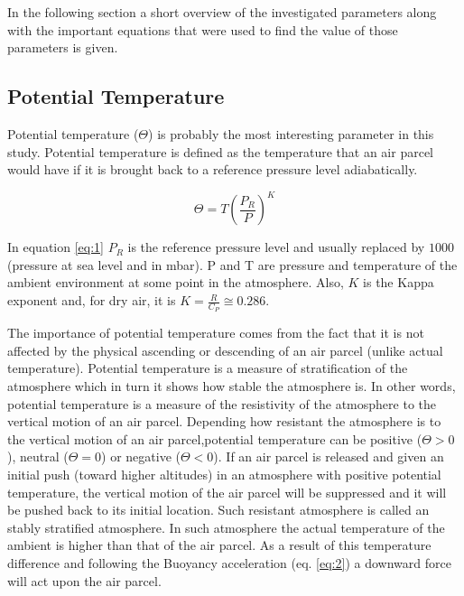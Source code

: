 \documentclass[a4paper,12pt]{article}
\numberwithin{equation}{section} %
\begin{document}
In the following section a short overview of the investigated parameters along with the important equations that were used to find the value of those parameters is given.

\subsection{Potential Temperature}

Potential temperature ($\Theta$) is probably the most interesting parameter in this study. Potential temperature is defined as the temperature that an air parcel would have if it is brought back to a reference pressure level adiabatically.

\vspace{0.5cm}

\begin{equation}\label{eq:1}
\Theta = T(\frac{P_R}{P})^K
\end{equation}

\vspace{0.5cm}

In equation \ref{eq:1} $P_R$ is the reference pressure level and usually replaced by $1000$ (pressure at sea level and in mbar). P and T are pressure and temperature of the ambient environment at some point in the atmosphere. Also, $K$ is the Kappa exponent and, for dry air, it is $K = \frac{R}{C_P}\cong 0.286$.

The importance of potential temperature comes from the fact that it is not affected by the physical ascending or descending of an air parcel (unlike actual temperature). Potential temperature is a measure of stratification of the atmosphere which in turn it shows how stable the atmosphere is. In other words, potential temperature is a measure of the resistivity of the atmosphere to the vertical motion of an air parcel. Depending how resistant the atmosphere is to the vertical motion of an air parcel,potential temperature can be positive ($\Theta > 0$), neutral ($\Theta = 0$) or negative ($\Theta < 0$). If an air parcel is released and given an initial push (toward higher altitudes) in an atmosphere with positive potential temperature, the vertical motion of the air parcel will be suppressed and it will be pushed back to its initial location. Such resistant atmosphere is called an stably stratified atmosphere. In such atmosphere the actual temperature of the ambient is higher than that of the air parcel. As a result of this temperature difference and following the Buoyancy acceleration (eq. \ref{eq:2}) a downward force will act upon the air parcel.
\end{document}
